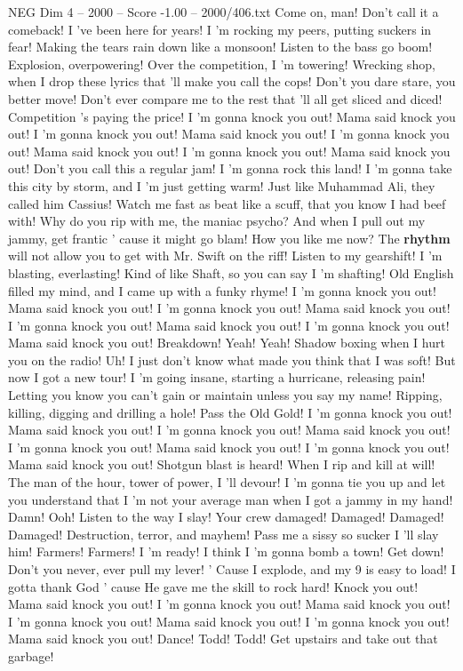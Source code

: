 \begin{textsample}{NEG Dim 4 – 2000 – Score -1.00 – 2000/406.txt}  \label{ex:f4_neg_040}
Come on, man!
Don't call it a comeback!
I 've been here for years!
I 'm rocking my peers, putting suckers in fear!
Making the tears rain down like a monsoon!
Listen to the bass go boom!
Explosion, overpowering!
Over the competition, I 'm towering!
Wrecking shop, when I drop these lyrics that 'll make you call the cops!
Don't you dare stare, you better move!
Don't ever compare me to the rest that 'll all get sliced and diced!
Competition 's paying the price!
I 'm gonna knock you out!
Mama said knock you out!
I 'm gonna knock you out!
Mama said knock you out!
I 'm gonna knock you out!
Mama said knock you out!
I 'm gonna knock you out!
Mama said knock you out!
Don't you call this a regular jam!
I 'm gonna rock this land!
I 'm gonna take this city by storm, and I 'm just getting warm!
Just like Muhammad Ali, they called him Cassius!
Watch me fast as beat like a scuff, that you know I had beef with!
Why do you rip with me, the maniac psycho?
And when I pull out my jammy, get frantic ' cause it might go blam!
How you like me now?
The \textbf{rhythm} will not allow you to get with Mr.
Swift on the riff!
Listen to my gearshift!
I 'm blasting, everlasting!
Kind of like Shaft, so you can say I 'm shafting!
Old English filled my mind, and I came up with a funky rhyme!
I 'm gonna knock you out!
Mama said knock you out!
I 'm gonna knock you out!
Mama said knock you out!
I 'm gonna knock you out!
Mama said knock you out!
I 'm gonna knock you out!
Mama said knock you out!
Breakdown!
Yeah!
Yeah!
Shadow boxing when I hurt you on the radio!
Uh!
I just don't know what made you think that I was soft!
But now I got a new tour!
I 'm going insane, starting a hurricane, releasing pain!
Letting you know you can't gain or maintain unless you say my name!
Ripping, killing, digging and drilling a hole!
Pass the Old Gold!
I 'm gonna knock you out!
Mama said knock you out!
I 'm gonna knock you out!
Mama said knock you out!
I 'm gonna knock you out!
Mama said knock you out!
I 'm gonna knock you out!
Mama said knock you out!
Shotgun blast is heard!
When I rip and kill at will!
The man of the hour, tower of power, I 'll devour!
I 'm gonna tie you up and let you understand that I 'm not your average man when I got a jammy in my hand!
Damn!
Ooh!
Listen to the way I slay!
Your crew damaged!
Damaged!
Damaged!
Damaged!
Destruction, terror, and mayhem!
Pass me a sissy so sucker I 'll slay him!
Farmers!
Farmers!
I 'm ready!
I think I 'm gonna bomb a town!
Get down!
Don't you never, ever pull my lever! ' Cause I explode, and my 9 is easy to load!
I gotta thank God ' cause He gave me the skill to rock hard!
Knock you out!
Mama said knock you out!
I 'm gonna knock you out!
Mama said knock you out!
I 'm gonna knock you out!
Mama said knock you out!
I 'm gonna knock you out!
Mama said knock you out!
Dance!
Todd!
Todd!
Get upstairs and take out that garbage!

\end{textsample}
